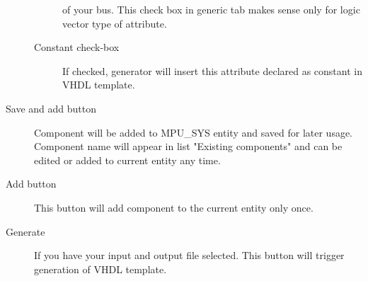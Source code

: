 \begin{description}
\begin{description}
                    of your bus. This check box in generic tab makes sense only for logic vector type of attribute.
                \item [Constant check-box]
                    If checked, generator will insert this attribute declared as constant in VHDL template.
            \end{description}
        \item [Save and add button]
            Component will be added to MPU\_SYS entity and saved for later usage. Component name will appear in list "Existing components" and can be edited or added to current entity any time.
        \item [Add button]
            This button will add component to the current entity only once.
        \item [Generate]
            If you have your input and output file selected. This button will trigger generation of VHDL template.\\
    \end{description}
